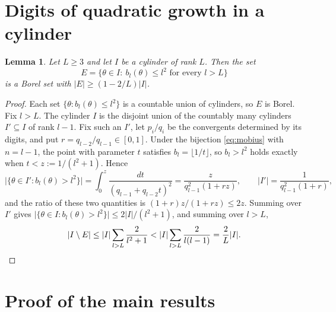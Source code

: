 \documentclass{amsart}
\newtheorem{lemma}[theorem]{Lemma}
\theoremstyle{definition}
\theoremstyle{remark}
\numberwithin{equation}{section}
\newcommand{\meas}[1]{\lvert #1 \rvert}
\begin{document}
\section{Digits of quadratic growth in a cylinder}\label{sec:cylinder}

\begin{lemma}\label{lem:cylinder}
Let $L\ge3$ and let $I$ be a cylinder of rank $L$. Then the set
\[
E=\{\theta\in I:\ b_l(\theta)\le l^2\text{ for every }l>L\}
\]
is a Borel set with $\meas{E}\ge(1-2/L)\meas{I}$.
\end{lemma}

\begin{proof}
Each set $\{\theta:b_l(\theta)\le l^2\}$ is a countable union of cylinders, so $E$ is Borel. Fix $l>L$. The cylinder $I$ is the disjoint union of the countably many cylinders $I'\subseteq I$ of rank $l-1$. Fix such an $I'$, let $p_i/q_i$ be the convergents determined by its digits, and put $r=q_{l-2}/q_{l-1}\in[0,1]$. Under the bijection \eqref{eq:mobius} with $n=l-1$, the point with parameter $t$ satisfies $b_l=\lfloor1/t\rfloor$, so $b_l>l^2$ holds exactly when $t<z:=1/(l^2+1)$. Hence
\[
\meas{\{\theta\in I':b_l(\theta)>l^2\}}=\int_0^z\frac{dt}{(q_{l-1}+q_{l-2}t)^2}=\frac{z}{q_{l-1}^2(1+rz)},\qquad
\meas{I'}=\frac{1}{q_{l-1}^2(1+r)},
\]
and the ratio of these two quantities is $(1+r)z/(1+rz)\le2z$. Summing over $I'$ gives $\meas{\{\theta\in I:b_l(\theta)>l^2\}}\le2\meas{I}/(l^2+1)$, and summing over $l>L$,
\[
\meas{I\setminus E}\le\meas{I}\sum_{l>L}\frac{2}{l^2+1}<\meas{I}\sum_{l>L}\frac{2}{l(l-1)}=\frac{2}{L}\meas{I}. \qedhere
\]
\end{proof}

\section{Proof of the main results}\label{sec:proof}
\end{document}
